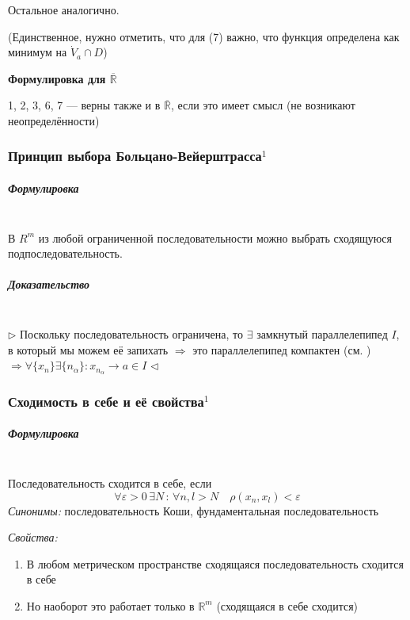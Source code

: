 \documentclass{article}
\let\vanillasubparagraph\subparagraph
\renewcommand{\subparagraph}[1]{\vanillasubparagraph{#1}\mbox{}\\}
\begin{document}
Остальное аналогично.

(Единственное, нужно отметить, что для (7) важно, что функция определена как минимум на $\dot{V}_a \cap D$)

\textbf{Формулировка для $\overline{\mathbb{R}}$}

1, 2, 3, 6, 7 --- верны также и в $\overline{\mathbb{R}}$, если это имеет смысл (не возникают неопределённости)


\subsubsection{Принцип выбора Больцано-Вейерштрасса\texorpdfstring{$^1$}{}}
\label{ПВБВ}
\subparagraph{Формулировка}
В $R^m$ из любой ограниченной последовательности можно выбрать сходящуюся подпоследовательность.

\subparagraph{Доказательство}
$\rhd$
Поскольку последовательность ограничена, то $\exists$ замкнутый параллелепипед $I$, в который мы можем её запихать $\Rightarrow$ это параллелепипед компактен (см. ) $\Rightarrow \forall \{x_n\} \exists \{n_\alpha\} : x_{n_\alpha} \rightarrow a \in I$
$\lhd$


\subsubsection{Сходимость в себе и её свойства\texorpdfstring{$^1$}{}}
\label{СВСИЕС}
\subparagraph{Формулировка}
Последовательность сходится в себе, если
$$
\forall \varepsilon > 0 \, \exists N \, :\, \forall n, l > N \quad \rho(x_n, x_l) < \varepsilon
$$
\textit{Синонимы:}
последовательность Коши, фундаментальная последовательность

\textit{Свойства:}
\begin{enumerate}
    \item В любом метрическом пространстве сходящаяся последовательность сходится в себе
    \item Но наоборот это работает только в $\mathbb{R}^m$ (сходящаяся в себе сходится)
\end{enumerate}
\end{document}
